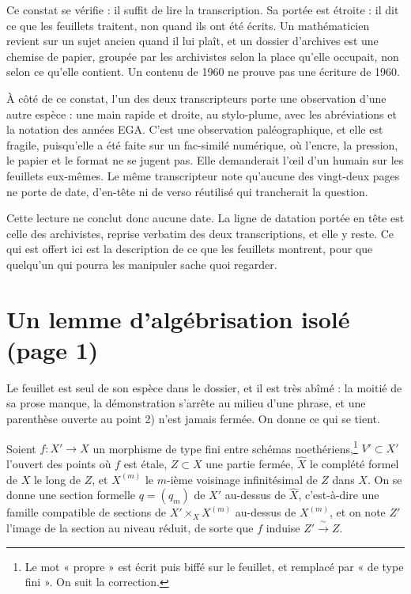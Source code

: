 \documentclass[11pt,a4paper]{article}
\begin{document}
Ce constat se vérifie : il suffit de lire la
transcription. Sa portée est étroite : il dit ce
que les feuillets traitent, non quand ils ont été écrits. Un
mathématicien revient sur un sujet ancien quand il lui plaît, et un dossier
d'archives est une chemise de papier, groupée par les archivistes selon la
place qu'elle occupait, non selon ce qu'elle contient. Un contenu de 1960 ne
prouve pas une écriture de 1960.

À côté de ce constat, l'un des deux transcripteurs porte une observation
d'une autre espèce : une main rapide et droite, au stylo-plume, avec les
abréviations et la notation des années EGA. C'est une observation
paléographique, et elle est fragile, puisqu'elle a été faite sur un fac-similé
numérique, où l'encre, la pression, le papier et le format ne se jugent
pas. Elle demanderait l'œil d'un humain sur les feuillets eux-mêmes. Le même
transcripteur note qu'aucune des vingt-deux pages ne porte de date, d'en-tête
ni de verso réutilisé qui trancherait la question.

Cette lecture ne conclut donc aucune date. La ligne de datation
portée en tête est celle des archivistes, reprise verbatim des deux
transcriptions, et elle y reste. Ce qui est offert ici est la description de
ce que les feuillets montrent, pour que quelqu'un qui pourra les manipuler
sache quoi regarder.

\section*{Un lemme d'algébrisation isolé (page 1)}

Le feuillet est seul de son espèce dans le dossier, et il est très abîmé :
la moitié de sa prose manque, la démonstration s'arrête au milieu d'une
phrase, et une parenthèse ouverte au point 2) n'est jamais fermée. On donne
ce qui se tient.

Soient $f : X' \to X$ un morphisme de type fini entre schémas
noethériens,\footnote{Le mot « propre » est écrit puis biffé sur le
feuillet, et remplacé par « de type fini ». On suit la correction.} $V'
\subset X'$ l'ouvert des points où $f$ est étale, $Z \subset X$ une partie
fermée, $\hat{X}$ le complété formel de $X$ le long de $Z$, et $X^{(m)}$ le
$m$-ième voisinage infinitésimal de $Z$ dans $X$. On se donne une section
formelle $q = (q_m)$ de $X'$ au-dessus de $\hat{X}$, c'est-à-dire une famille
compatible de sections de $X' \times_X X^{(m)}$ au-dessus de $X^{(m)}$, et on
note $Z'$ l'image de la section au niveau réduit, de sorte que $f$ induise
$Z' \xrightarrow{\ \sim\ } Z$.
\end{document}
